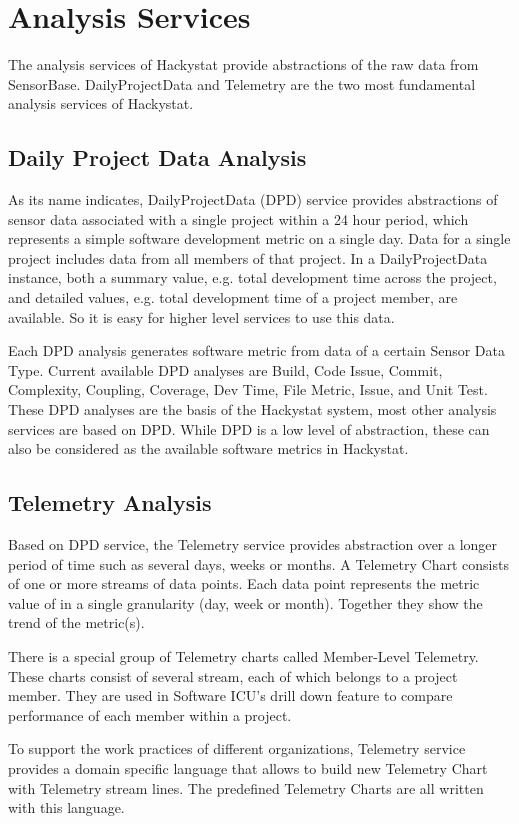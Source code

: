 \section{Analysis Services}
The analysis services of Hackystat provide abstractions of the raw data from SensorBase. DailyProjectData and Telemetry are the two most fundamental analysis services of Hackystat.

\subsection{Daily Project Data Analysis}
As its name indicates, DailyProjectData (DPD) service provides abstractions of sensor data associated with a single project within a 24 hour period, which represents a simple software development metric on a single day. Data for a single project includes data from all members of that project. In a DailyProjectData instance, both a summary value, e.g. total development time across the project, and detailed values, e.g. total development time of a project member, are available. So it is easy for higher level services to use this data.

Each DPD analysis generates software metric from data of a certain Sensor Data Type. Current available DPD analyses are Build, Code Issue, Commit, Complexity, Coupling, Coverage, Dev Time, File Metric, Issue, and Unit Test. These DPD analyses are the basis of the Hackystat system, most other analysis services are based on DPD. While DPD is a low level of abstraction, these can also be considered as the available software metrics in Hackystat.

\subsection{Telemetry Analysis}
Based on DPD service, the Telemetry service provides abstraction over a longer period of time such as several days, weeks or months. A Telemetry Chart consists of one or more streams of data points. Each data point represents the metric value of in a single granularity (day, week or month). Together they show the trend of the metric(s).

There is a special group of Telemetry charts called Member-Level Telemetry. These charts consist of several stream, each of which belongs to a project member. They are used in Software ICU's drill down feature to compare performance of each member within a project. 

To support the work practices of different organizations, Telemetry service provides a domain specific language that allows to build new Telemetry Chart with Telemetry stream lines. The predefined Telemetry Charts are all written with this language.

